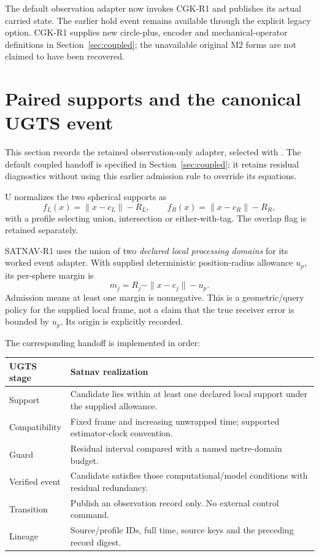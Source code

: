 The default observation adapter now invokes CGK-R1 and publishes its actual
carried state. The earlier hold event remains available through the explicit
legacy option. CGK-R1 supplies new circle-plus, encoder and mechanical-operator
definitions in Section~\ref{sec:coupled}; the unavailable original M2 forms are
not claimed to have been recovered.
\clearpage

\section{Paired supports and the canonical UGTS event}
This section records the retained observation-only adapter, selected with
. The default coupled handoff is specified in
Section~\ref{sec:coupled}; it retains residual diagnostics without using this
earlier admission rule to override its equations.

U normalizes the two spherical supports as
\begin{equation}
f_L(x)=\|x-c_L\|-R_L,\qquad f_R(x)=\|x-c_R\|-R_R,
\end{equation}
with a profile selecting union, intersection or either-with-tag. The overlap flag
is retained separately. 

SATNAV-R1 uses the union of two \emph{declared local processing domains} for its
worked event adapter. With supplied deterministic position-radius allowance $u_p$,
its per-sphere margin is
\begin{equation}
m_j=R_j-\|x-c_j\|-u_p.
\end{equation}
Admission means at least one margin is nonnegative. This is a geometric/query policy
for the supplied local frame, not a claim that the true receiver error is bounded by
$u_p$. Its origin is explicitly recorded. 

The corresponding handoff is implemented in order:
\begin{center}
\begin{tabularx}{\textwidth}{@{}P{.24\textwidth}Y@{}}\toprule
\textbf{UGTS stage} & \textbf{Satnav realization}\\\midrule
Support & Candidate lies within at least one declared local support under the supplied allowance.\\
Compatibility & Fixed frame and increasing unwrapped time; supported estimator-clock convention.\\
Guard & Residual interval compared with a named metre-domain budget.\\
Verified event & Candidate satisfies those computational/model conditions with residual redundancy.\\
Transition & Publish an observation record only. No external control command.\\
Lineage & Source/profile IDs, full time, source keys and the preceding record digest.\\\bottomrule
\end{tabularx}
\end{center}

